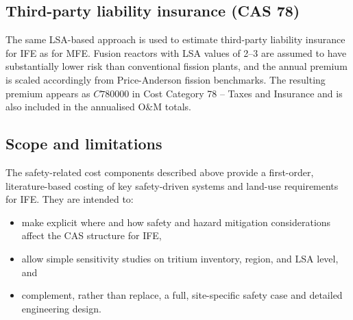 \subsection{Third-party liability insurance (CAS 78)}

The same LSA-based approach is used to estimate third-party liability
insurance for IFE as for MFE\cite{Holdren1991Safety,Miller2003ARIESST,
NRCInsurance2024}. Fusion reactors with LSA values of 2--3 are assumed
to have substantially lower risk than conventional fission plants, and
the annual premium is scaled accordingly from Price-Anderson fission
benchmarks. The resulting premium appears as \(C780000\) in Cost
Category 78 – Taxes and Insurance and is also included in the annualised
O\&M totals.

\subsection{Scope and limitations}

The safety-related cost components described above provide a
first-order, literature-based costing of key safety-driven systems and
land-use requirements for IFE. They are intended to:
\begin{itemize}
  \item make explicit where and how safety and hazard mitigation
        considerations affect the CAS structure for IFE,
  \item allow simple sensitivity studies on tritium inventory, region,
        and LSA level, and
  \item complement, rather than replace, a full, site-specific safety
        case and detailed engineering design.
\end{itemize}
\fi

